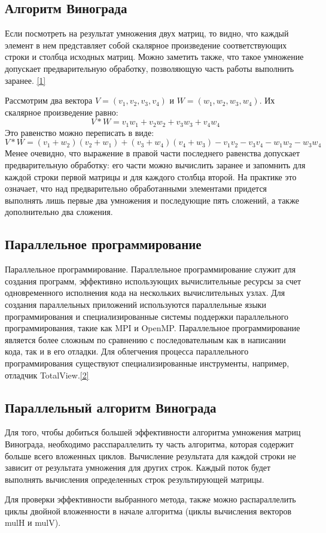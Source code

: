 \documentclass[14pt, a4paper]{extarticle}
\begin{document}
\subsection{Алгоритм Винограда}
Если посмотреть на результат умножения двух матриц, то видно, что каждый элемент в нем представляет собой скалярное произведение соответствующих строки и столбца исходных матриц. Можно заметить также, что такое умножение допускает предварительную обработку, позволяющую часть работы выполнить заранее. \hyperref[literature]{[1]}\par
Рассмотрим два вектора $V = (v_{1},v_{2},v_{3},v_{4})$ и $W = (w_{1},w_{2},w_{3},w_{4})$. Их скалярное произведение равно:
\begin{equation}
	V * W = v_{1}w_{1} + v_{2}w_{2} + v_{3}w_{3} + v_{4}w_{4}
\end{equation}
Это равенство можно переписать в виде:
\begin{equation}
	V * W = (v_{1} + w_{2})(v_{2} + w_{1}) + (v_{3} + w_{4})(v_{4} + w_{3}) -  v_{1}v_{2} - v_{3}v_{4} - w_{1}w_{2} - w_{3}w_{4}
\end{equation}
Менее очевидно, что выражение в правой части последнего равенства допускает предварительную обработку: его части можно вычислить заранее и запомнить для каждой строки первой матрицы и для каждого столбца второй. На практике это означает, что над предварительно обработанными элементами придется выполнять лишь первые два умножения и последующие пять сложений, а также дополнительно два сложения. 
\subsection{Параллельное программирование}
Параллельное программирование. Параллельное программирование служит для создания программ, эффективно использующих вычислительные ресурсы за счет одновременного исполнения кода на нескольких вычислительных узлах. Для создания параллельных приложений используются параллельные языки программирования и специализированные системы поддержки параллельного программирования, такие как MPI и OpenMP. Параллельное программирование является более сложным по сравнению с последовательным как в написании кода, так и в его отладки. Для облегчения процесса параллельного программирования существуют специализированные инструменты, например, отладчик TotalView.\hyperref[literature]{[2]}
\subsection{Параллельный алгоритм Винограда}
Для того, чтобы добиться большей эффективности алгоритма умножения матриц Винограда, необходимо расспараллелить ту часть алгоритма, которая содержит больше всего вложенных циклов. Вычисление результата для каждой строки не зависит от результата умножения для других строк. Каждый поток будет выполнять вычисления определенных строк результирующей матрицы.\par
Для проверки эффективности выбранного метода, также можно распараллелить циклы двойной вложенности в начале алгоритма (циклы вычисления векторов mulH и mulV).
\end{document}
